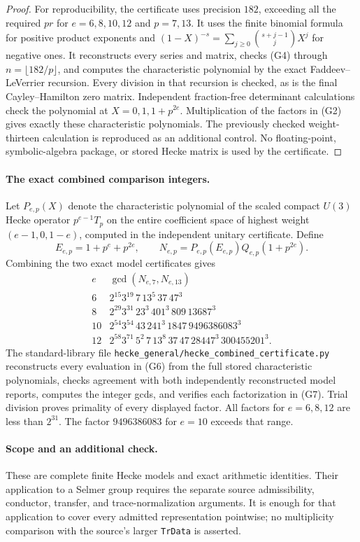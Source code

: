 \begin{proof}
For reproducibility, the certificate uses precision $182$, exceeding
all the required $pr$ for $e=6,8,10,12$ and $p=7,13$.
It uses the finite binomial formula for positive product exponents and
$(1-X)^{-s}=\sum_{j\ge0}\binom{s+j-1}{j}X^j$ for negative ones.
It reconstructs every series and matrix, checks (G4) through
$n=\lfloor182/p\rfloor$, and computes the characteristic polynomial by
the exact Faddeev--LeVerrier recursion. Every division in that recursion
is checked, as is the final Cayley--Hamilton zero matrix.
Independent fraction-free determinant calculations check the polynomial
at $X=0,1,1+p^{2e}$. Multiplication of the factors in (G2) gives exactly
these characteristic polynomials. The previously checked weight-thirteen
calculation is reproduced as an additional control. No floating-point,
symbolic-algebra package, or stored Hecke matrix is used by the certificate.
\end{proof}

\paragraph{The exact combined comparison integers.}
Let $P_{e,p}(X)$ denote the characteristic polynomial of the scaled
compact $U(3)$ Hecke operator $p^{e-1}T_p$ on the entire coefficient
space of highest weight $(e-1,0,1-e)$, computed in the independent
unitary certificate. Define
\[
 E_{e,p}=1+p^e+p^{2e},\qquad
 N_{e,p}=P_{e,p}(E_{e,p})Q_{e,p}(1+p^{2e}).
 \tag{G6}
\]
Combining the two exact model certificates gives
\[
\begin{array}{c|l}
e&\gcd(N_{e,7},N_{e,13})\\ \hline
6&2^{15}3^{19}\,7\,13^5\,37\,47^3\\
8&2^{29}3^{31}\,23^3\,401^3\,809\,13687^3\\
10&2^{54}3^{54}\,43\,241^3\,1847\,9496386083^3\\
12&2^{58}3^{71}\,5^2\,7\,13^8\,37\,47\,28447^3\,300455201^3.
\end{array}
\tag{G7}
\]
The standard-library file
\texttt{hecke\_general/hecke\_combined\_certificate.py} reconstructs every
evaluation in (G6) from the full stored characteristic polynomials,
checks agreement with both independently reconstructed model reports,
computes the integer gcds, and verifies each factorization in (G7).
Trial division proves primality of every displayed factor. All factors
for $e=6,8,12$ are less than $2^{31}$. The factor $9496386083$ for
$e=10$ exceeds that range.

\paragraph{Scope and an additional check.}
These are complete finite Hecke models and exact arithmetic identities.
Their application to a Selmer group requires the separate source
admissibility, conductor, transfer, and trace-normalization arguments.
It is enough for that application to cover every admitted representation
pointwise; no multiplicity comparison with the source's larger
\texttt{TrData} is asserted.

